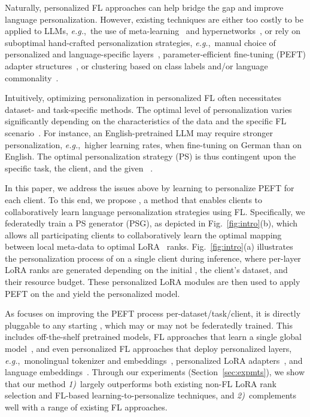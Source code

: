 Naturally, personalized FL approaches can help bridge the gap and improve language personalization. However, existing techniques are either too costly to be applied to LLMs, \textit{e.g.},~the use of meta-learning~\cite{fedmeta} and  hypernetworks~\cite{pfedhn}, or rely on suboptimal hand-crafted personalization strategies, \textit{e.g.},~manual choice of personalized and language-specific layers~\cite{DEPT,zhao2023breaking,fedlora,fdlora}, parameter-efficient fine-tuning (PEFT) adapter structures~\cite{SA-FedLora, FedDPA}, or clustering based on class labels and/or language commonality~\cite{hypcluster,cfl,fedllm-bench}.

Intuitively, optimizing personalization in personalized FL often necessitates dataset- and task-specific methods. The optimal level of personalization varies significantly depending on the characteristics of the data and the specific FL scenario~\citep{chen2022pfl,fedllm-bench}. For instance, an English-pretrained LLM may require stronger personalization, \textit{e.g.},~higher learning rates, when fine-tuning on German than on English. The optimal personalization strategy (PS) is thus contingent upon the specific task, the client, and the given \basemodel{}~\cite{royson2023fedl2p}. 

In this paper, we address the issues above by learning to personalize PEFT for each client. To this end, we propose \method{}, a method that enables clients to collaboratively learn language personalization strategies using FL. Specifically, we federatedly train a PS generator (PSG), as depicted in Fig.~\ref{fig:intro}(b), which allows all participating clients to collaboratively learn the optimal mapping between local meta-data to optimal LoRA~\cite{hu2021lora} ranks. Fig.~\ref{fig:intro}(a) illustrates the personalization process of \method{} on a single client during inference, where per-layer LoRA ranks are generated depending on the initial \basemodel{}, the client's dataset, and their resource budget. These personalized LoRA modules are then used to apply PEFT on the \basemodel{} and yield the personalized model. 

As \method{} focuses on improving the PEFT process per-dataset/task/client, it is directly pluggable to any starting \basemodel{}, which may or may not be federatedly trained. This includes off-the-shelf pretrained models, FL approaches that learn a single global model~\cite{fedavg,fedbabu,scaffold,feddyn}, and even personalized FL approaches that deploy personalized layers, \textit{e.g.},~monolingual tokenizer and embeddings~\cite{DEPT}, personalized LoRA adapters~\cite{fdlora, fedlora, FedDPA}, and language embeddings~\cite{FedPerC}. Through our experiments (Section~\ref{sec:expmts}), we show that our method \textit{1)}~largely outperforms both existing non-FL LoRA rank selection and FL-based learning-to-personalize techniques, and \textit{2)}~complements well with a range of existing FL approaches.


